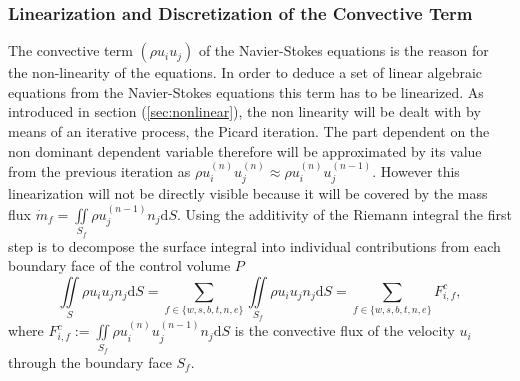       \subsubsection{Linearization and Discretization of the Convective Term}

      The convective term \(\left( \rho u_i u_j \right)\) of the Navier-Stokes equations is the reason for the non-linearity of the equations. In order to deduce a set of linear algebraic equations from the Navier-Stokes equations this term has to be linearized. As introduced in section (\ref{sec:nonlinear}), the non linearity will be dealt with by means of an iterative process, the Picard iteration. The part dependent on the non dominant dependent variable therefore will be approximated by its value from the previous iteration as \( \rho u_i^{(n)} u_j^{(n)} \approx \rho u_i^{(n)} u_j^{(n-1)} \). However this linearization will not be directly visible because it will be covered by the mass flux \(\dot{m}_f = \iint\limits_{S_f} \rho u_j^{(n-1)} n_j \mathrm{d}S \). Using the additivity of the Riemann integral the first step is to decompose the surface integral into individual contributions from each boundary face of the control volume \(P\)
      \begin{displaymath}
      \iint\limits_S \rho u_i u_jn_j \mathrm{d}S
      = \sum_{f \in \{w,s,b,t,n,e\}} \iint\limits_{S_f}\rho u_{i} u_{j} n_{j} \mathrm{d}S
      = \sum_{f \in \{w,s,b,t,n,e\}} F_{i,f}^{c},
      \end{displaymath}
      where \(F_{i,f}^c := \iint\limits_{S_f} \rho u_{i}^{(n)} u_{j}^{(n-1)} n_{j} \mathrm{d}S \) is the convective flux of the velocity \(u_i\) through the boundary face \(S_f\). 
      
